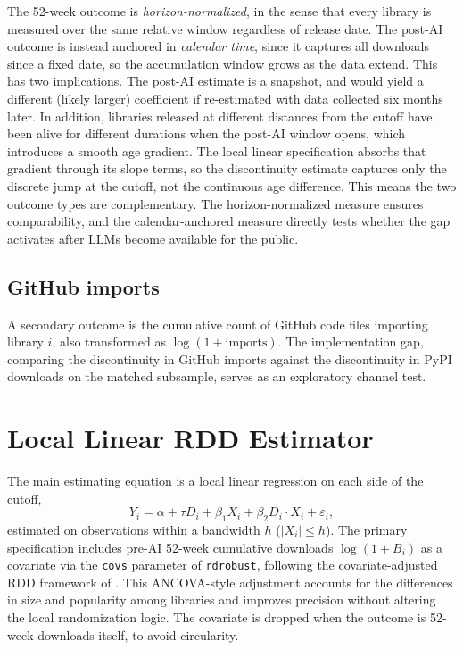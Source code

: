 \documentclass[12pt, a4paper]{report}
\begin{document}
The 52-week outcome is \textit{horizon-normalized}, in the sense that every library is measured over the same relative window regardless of release date. The post-AI outcome is instead anchored in \textit{calendar time}, since it captures all downloads since a fixed date, so the accumulation window grows as the data extend. This has two implications. The post-AI estimate is a snapshot, and would yield a different (likely larger) coefficient if re-estimated with data collected six months later. In addition, libraries released at different distances from the cutoff have been alive for different durations when the post-AI window opens, which introduces a smooth age gradient. The local linear specification absorbs that gradient through its slope terms, so the discontinuity estimate captures only the discrete jump at the cutoff, not the continuous age difference. This means the two outcome types are complementary. The horizon-normalized measure ensures comparability, and the calendar-anchored measure directly tests whether the gap activates after LLMs become available for the public.

\subsection{GitHub imports}\label{subsec:methods-github-outcomes}
A secondary outcome is the cumulative count of GitHub code files importing library $i$, also transformed as $\log(1 + \text{imports})$. The implementation gap, comparing the discontinuity in GitHub imports against the discontinuity in PyPI downloads on the matched subsample, serves as an exploratory channel test.

\section{Local Linear RDD Estimator}\label{sec:methods-rdd}
The main estimating equation is a local linear regression on each side of the cutoff,
$$Y_i = \alpha + \tau D_i + \beta_1 X_i + \beta_2 D_i \cdot X_i + \varepsilon_i,$$
estimated on observations within a bandwidth $h$ ($|X_i| \leq h$). The primary specification includes pre-AI 52-week cumulative downloads $\log(1 + B_i)$ as a covariate via the \texttt{covs} parameter of \texttt{rdrobust}, following the covariate-adjusted RDD framework of \citet{calonico2019covariates}. This ANCOVA-style adjustment accounts for the differences in size and popularity among libraries and improves precision without altering the local randomization logic. The covariate is dropped when the outcome is 52-week downloads itself, to avoid circularity.
\end{document}
